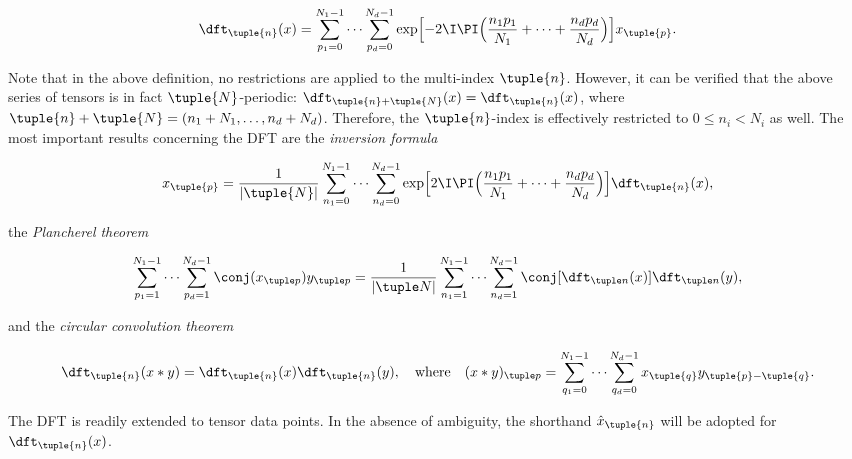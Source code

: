 \documentclass[oneside]{memoir}
\begin{document}
\begin{equation*}
\begin{split}\dft_{\tuple{n}}(x)=\sum_{p_1=0}^{N_1-1}\cdots\sum_{p_d=0}^{N_d-1}
\exp\Bigl[-2\I\PI\Bigl(\frac{n_1p_1}{N_1}
+\cdots+\frac{n_dp_d}{N_d}\Bigr)\Bigr] x_{\tuple{p}}.\end{split}\end{equation*}


Note that in the above definition, no restrictions are applied to the multi-index \(\tuple{n}\). However, it can be verified that the above series of tensors is in fact \(\tuple{N}\)-periodic: \(\dft_{\tuple{n}+\tuple{N}}(x)=\dft_{\tuple{n}}(x)\), where \(\tuple{n}+\tuple{N}=(n_1+N_1, \ldots, n_d+N_d)\). Therefore, the \(\tuple{n}\)-index is effectively restricted to \(0\leq n_i<N_i\) as well. The most important results concerning the DFT are the \emph{inversion formula}



\begin{equation*}
\begin{split}x_{\tuple{p}}=\frac1{\lvert\tuple{N}\rvert}\sum_{n_1=0}^{N_1-1}\cdots
\sum_{n_d=0}^{N_d-1}\exp\Bigl[2\I\PI\Bigl(\frac{n_1p_1}{N_1}+\cdots+
\frac{n_dp_d}{N_d}\Bigr)\Bigr]\dft_{\tuple{n}}(x),\end{split}\end{equation*}


the \emph{Plancherel theorem}



\begin{equation*}
\begin{split}\sum_{p_1=1}^{N_1-1}\cdots\sum_{p_d=1}^{N_d-1}\conj(x_{\tuple p})y_{\tuple p}
=\frac1{\lvert\tuple N\rvert}\sum_{n_1=1}^{N_1-1}\cdots\sum_{n_d=1}^{N_d-1}
\conj[\dft_{\tuple n}(x)]\dft_{\tuple n}(y),\end{split}\end{equation*}


and the \emph{circular convolution theorem}



\begin{equation*}
\begin{split}\dft_{\tuple{n}}(x\ast y)=\dft_{\tuple{n}}(x)\dft_{\tuple{n}}(y),
\quad\text{where}\quad
(x\ast y)_{\tuple p}=\sum_{q_1=0}^{N_1-1}\cdots\sum_{q_d=0}^{N_d-1}
x_{\tuple{q}}y_{\tuple{p}-\tuple{q}}.\end{split}\end{equation*}


The DFT is readily extended to tensor data points. In the absence of ambiguity, the shorthand \(\hat{x}_{\tuple{n}}\) will be adopted for \(\dft_{\tuple{n}}(x)\).
\end{document}
